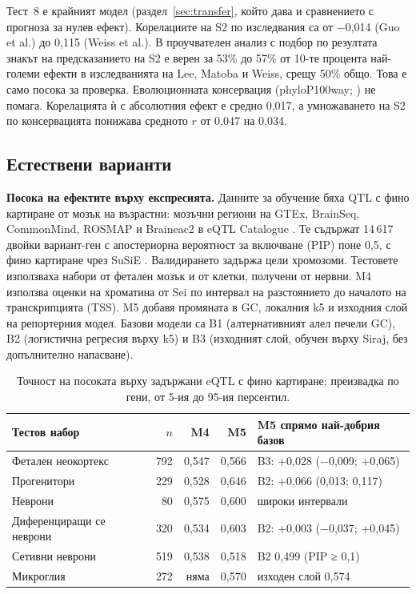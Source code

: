 \documentclass[10.5pt,a4paper]{article}
\begin{document}
Тест~8 е крайният модел (раздел~\ref{sec:transfer}, който дава и сравнението с прогноза за нулев ефект). Корелациите на S2 по изследвания са от −0,014 (Guo et al.) до 0,115 (Weiss et al.). В проучвателен анализ с подбор по резултата знакът на предсказанието на S2 е верен за 53\% до 57\% от 10-те процента най-големи ефекти в изследванията на Lee, Matoba и Weiss, срещу 50\% общо. Това е само посока за проверка. Еволюционната консервация (phyloP100way; \citealt{pollard2010}) не помага. Корелацията ѝ с абсолютния ефект е средно 0,017, а умножаването на S2 по консервацията понижава средното $r$ от 0,047 на 0,034.

\subsection{Естествени варианти}

\textbf{Посока на ефектите върху експресията.} Данните за обучение бяха QTL с фино картиране от мозък на възрастни: мозъчни региони на GTEx, BrainSeq, CommonMind, ROSMAP и Braineac2 в eQTL Catalogue \citep{gtex2020,jaffe2018,fromer2016,ng2017,ramasamy2014,kerimov2021}. Те съдържат 14\,617 двойки вариант-ген с апостериорна вероятност за включване (PIP) поне 0,5, с фино картиране чрез SuSiE \citep{wang2020}. Валидирането задържа цели хромозоми. Тестовете използваха набори от фетален мозък и от клетки, получени от нервни. M4 използва оценки на хроматина от Sei по интервал на разстоянието до началото на транскрипцията (TSS). M5 добавя промяната в GC, локалния k5 и изходния слой на репортерния модел. Базови модели са B1 (алтернативният алел печели GC), B2 (логистична регресия върху k5) и B3 (изходният слой, обучен върху Siraj, без допълнително напасване).

\begin{table}[tb]
\small
\caption{Точност на посоката върху задържани eQTL с фино картиране; преизвадка по гени, от 5-ия до 95-ия персентил.}\label{tab:direction}
\begin{tabular}{@{}L{54mm}r r r L{42mm}@{}}
\toprule
Тестов набор & $n$ & M4 & M5 & M5 спрямо най-добрия базов \\
\midrule
Фетален неокортекс \citep{walker2019} & 792 & 0,547 & 0,566 & B3: +0,028 (−0,009; +0,065) \\
Прогенитори \citep{aygun2021} & 229 & 0,528 & 0,646 & B2: +0,066 (0,013; 0,117) \\
Неврони \citep{aygun2021} & 80 & 0,575 & 0,600 & широки интервали \\
Диференциращи се неврони \citep{jerber2021} & 320 & 0,534 & 0,603 & B2: +0,003 (−0,037; +0,045) \\
Сетивни неврони \citep{schwartzentruber2018} & 519 & 0,538 & 0,518 & B2 0,499 (PIP ≥ 0,1) \\
Микроглия \citep{young2021} & 272 & няма & 0,570 & изходен слой 0,574 \\
\bottomrule
\end{tabular}
\end{table}
\end{document}
